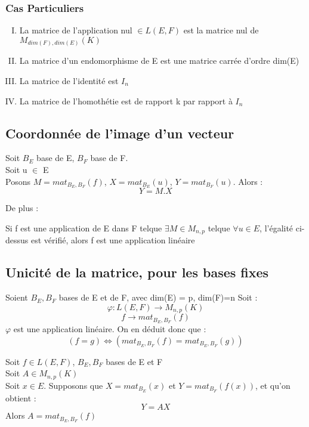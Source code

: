 \subsubsection{Cas Particuliers}
\begin{enumerate}[I) ]
 \item La matrice de l'application nul $\in L(E,F)$ est la matrice nul de $M_{dim(F),dim(E)}(K)$\\
 \item La matrice d'un endomorphisme de E est une matrice carrée d'ordre dim(E)
 \item La matrice de l'identité est $I_n$
 \item La matrice de l'homothétie est de rapport k par rapport à $I_n$
\end{enumerate}
\subsection{Coordonnée de l'image d'un vecteur}
\begin{de}
Soit $B_E$ base de E, $B_F$ base de F. \\
Soit u $\in$ E \\
Posons $M = mat_{B_E,B_F}(f)$, $X = mat_{B_E}(u)$, $Y = mat_{B_F}(u)$. Alors :
$$Y = M.X$$
\end{de}
De plus : 
\begin{theo}
 Si f est une application de E dans F telque $\exists M \in M_{n,p}$ telque $\forall u \in E$, l'égalité ci-dessus est vérifié, alors f est une application linéaire
\end{theo}
\subsection{Unicité de la matrice, pour les bases fixes}
\begin{de}
Soient $B_E,B_F$ bases de E et de F, avec dim(E) = p, dim(F)=n
Soit : 
$$\varphi : L(E,F) \rightarrow M_{n,p}(K)$$
$$f \rightarrow mat_{B_E,B_F}(f)$$
$\varphi$ est une application linéaire. On en déduit donc que :
$$(f=g)\Leftrightarrow(mat_{B_E,B_F}(f)=mat_{B_E,B_F}(g))$$
\end{de}
\begin{prop}
Soit $f \in L(E,F)$, $B_E,B_F$ bases de E et F\\
Soit $A \in M_{n,p}(K)$ \\
Soit $x \in E$. Supposons que $X = mat_{B_E}(x)$ et $Y=mat_{B_F}(f(x))$, et qu'on obtient :
$$Y = AX $$
Alors $A = mat_{B_E,B_F}(f)$
\end{prop}
